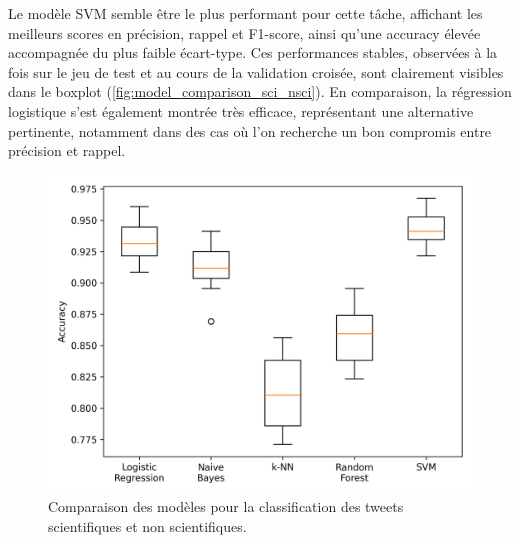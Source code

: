 \noindent Le modèle SVM semble être le plus performant pour cette tâche, affichant les meilleurs scores en précision, rappel et F1-score, ainsi qu’une accuracy élevée accompagnée du plus faible écart-type.
Ces performances stables, observées à la fois sur le jeu de test et au cours de la validation croisée, sont clairement visibles dans le boxplot (\autoref{fig:model_comparison_sci_nsci}).
En comparaison, la régression logistique s’est également montrée très efficace, représentant une alternative pertinente, notamment dans des cas où l’on recherche un bon compromis entre précision et rappel.
\vspace{-1em}
\begin{figure}[H]
    \centering
    \begin{minipage}[b]{0.55\textwidth}
        \centering
        \includegraphics[width=\textwidth]{images/model_comparison_1}
        \caption{Comparaison des modèles pour la classification des tweets scientifiques et non scientifiques.}
        \label{fig:model_comparison_sci_nsci}
    \end{minipage}\hfill
    \begin{minipage}[b]{0.4\textwidth}
        \centering

\end{minipage}
\end{figure}
